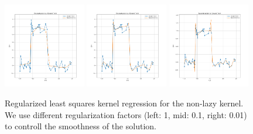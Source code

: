 \begin{figure}
    \centering
    \includegraphics[width=0.32\textwidth]{figures/nonlazy-square-noise-lsq-1e0.png}
    \includegraphics[width=0.32\textwidth]{figures/nonlazy-square-noise-lsq-1e-1.png}
    \includegraphics[width=0.32\textwidth]{figures/nonlazy-square-noise-lsq-1e-2.png}
    \caption{Regularized least squares kernel regression for the non-lazy kernel. We use different regularization factors (left: 1, mid: 0.1, right: 0.01) to controll the smoothness of the solution.}
    \label{fig:lsq-non-lazy}
\end{figure}